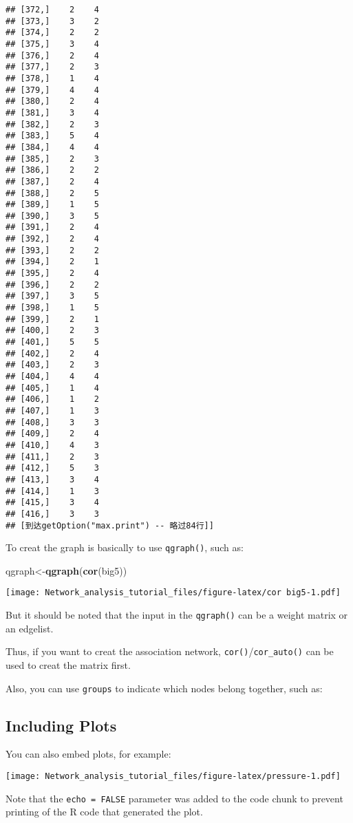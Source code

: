 \documentclass[]{article}
\newenvironment{Shaded}{\begin{snugshade}}{\end{snugshade}}
\newcommand{\KeywordTok}[1]{\textcolor[rgb]{0.13,0.29,0.53}{\textbf{#1}}}
\newcommand{\NormalTok}[1]{#1}
\begin{document}
\begin{verbatim}
## [372,]    2    4
## [373,]    3    2
## [374,]    2    2
## [375,]    3    4
## [376,]    2    4
## [377,]    2    3
## [378,]    1    4
## [379,]    4    4
## [380,]    2    4
## [381,]    3    4
## [382,]    2    3
## [383,]    5    4
## [384,]    4    4
## [385,]    2    3
## [386,]    2    2
## [387,]    2    4
## [388,]    2    5
## [389,]    1    5
## [390,]    3    5
## [391,]    2    4
## [392,]    2    4
## [393,]    2    2
## [394,]    2    1
## [395,]    2    4
## [396,]    2    2
## [397,]    3    5
## [398,]    1    5
## [399,]    2    1
## [400,]    2    3
## [401,]    5    5
## [402,]    2    4
## [403,]    2    3
## [404,]    4    4
## [405,]    1    4
## [406,]    1    2
## [407,]    1    3
## [408,]    3    3
## [409,]    2    4
## [410,]    4    3
## [411,]    2    3
## [412,]    5    3
## [413,]    3    4
## [414,]    1    3
## [415,]    3    4
## [416,]    3    3
## [到达getOption("max.print") -- 略过84行]]
\end{verbatim}

To creat the graph is basically to use \texttt{qgraph()}, such as:

\begin{Shaded}
\begin{Highlighting}[]
\NormalTok{qgraph<-}\KeywordTok{qgraph}\NormalTok{(}\KeywordTok{cor}\NormalTok{(big5))}
\end{Highlighting}
\end{Shaded}

\texttt{[image: Network\_analysis\_tutorial\_files/figure-latex/cor big5-1.pdf]}

But it should be noted that the input in the \texttt{qgraph()} can be a
weight matrix or an edgelist.

Thus, if you want to creat the association network,
\texttt{cor()}/\texttt{cor\_auto()} can be used to creat the matrix
first.

Also, you can use \texttt{groups} to indicate which nodes belong
together, such as:

\subsection{Including Plots}\label{including-plots}

You can also embed plots, for example:

\texttt{[image: Network\_analysis\_tutorial\_files/figure-latex/pressure-1.pdf]}

Note that the \texttt{echo\ =\ FALSE} parameter was added to the code
chunk to prevent printing of the R code that generated the plot.
\end{document}
